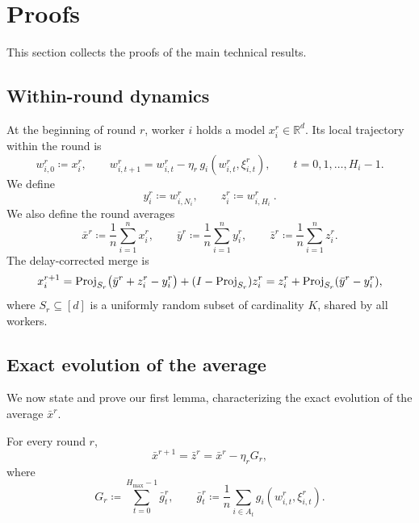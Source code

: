 \documentclass{article}
\newcommand{\R}{\mathbb{R}}  %
\newcommand{\eqdef}{\coloneqq}
\newcommand{\Proj}{{\rm Proj}} %
\theoremstyle{plain}
\theoremstyle{definition}
\begin{document}
\section{Proofs}\label{sec:proofs}
This section collects the proofs of the main technical results.
\subsection{Within-round dynamics}
% 
At the beginning of round \(r\), worker \(i\) holds a model \(x_i^r\in\R^d\).
Its local trajectory within the round is
\begin{equation}\label{eq:j099u0f9d8y98gfg}
    w_{i,0}^r \eqdef x_i^r,
    \qquad
    w_{i,t+1}^r
    =
    w_{i,t}^r-\eta_r\, g_i(w_{i,t}^r,\xi_{i,t}^r),
    \qquad
    t=0,1,\dots,H_i-1.
\end{equation}
% 
We define
% 
\begin{equation}\label{eq:ni90yfd87y98fdig}
    y_i^r \eqdef w_{i,N_i}^r,
    \qquad
    z_i^r \eqdef w_{i,H_i}^r ~.
\end{equation}
% 
We also define the round averages
% 
\begin{equation}
\label{eq:averages}
    \bar x^r \eqdef \frac{1}{n}\sum_{i=1}^n x_i^r,
    \qquad
    \bar y^r \eqdef \frac{1}{n}\sum_{i=1}^n y_i^r,
    \qquad
    \bar z^r \eqdef \frac{1}{n}\sum_{i=1}^n z_i^r.
\end{equation}
% 
The delay-corrected merge is
% 
\begin{equation}\label{eq:corrected_merge}
    x_i^{r+1}
    =
    \Proj_{S_r}\bigl(\bar y^r+z_i^r-y_i^r\bigr)+(I-\Proj_{S_r})z_i^r
    =
    z_i^r + \Proj_{S_r}(\bar y^r-y_i^r),
\end{equation}
% 
where \(S_r\subseteq[d]\) is a uniformly random subset of cardinality \(K\), shared by all workers.

\subsection{Exact evolution of the average}

We now state and prove our first lemma, characterizing the exact evolution of the average $\bar x^r$.

\begin{lemma}
\label{lem:avg_evol_09vdf}For every round \(r\),
\begin{equation}\label{eq:no8yfd9y89fd08ygf}
\bar x^{r+1}=\bar z^r = \bar x^r-\eta_r G_r,
\end{equation}
where
\begin{equation}\label{eq:oi-f9ud0fdg}
G_r \eqdef \sum_{t=0}^{H_{\max}-1} \bar g_t^r,
\qquad
\bar g_t^r \eqdef \frac{1}{n}\sum_{i\in A_t} g_i(w_{i,t}^r,\xi_{i,t}^r).
\end{equation}
\end{lemma}
\end{document}
